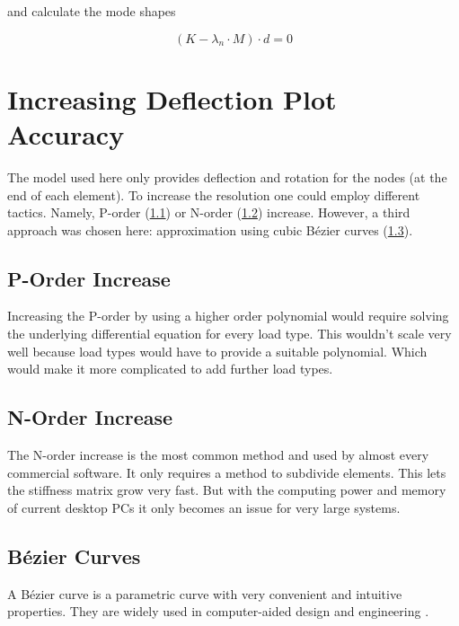 and calculate the mode shapes

\begin{equation*} \label{modeshape}
(K - \lambda_n \cdot M) \cdot d = 0 
\end{equation*}

\section{Increasing Deflection Plot Accuracy}
\label{sec:deflplotaccu}

The model used here only provides deflection and rotation for the nodes (at the end of each element). To increase the resolution one could employ different tactics.
Namely, P-order (\cref{subsec:porder}) or N-order (\cref{subsec:norder}) increase.
However, a third approach was chosen here: approximation using cubic B\'{e}zier curves (\cref{subsec:bezier}).

\subsection{P-Order Increase}
\label{subsec:porder}

Increasing the P-order by using a higher order polynomial would require solving the underlying differential equation for every load type.
This wouldn't scale very well because load types would have to provide a suitable polynomial. Which would make it more complicated to add further load types. 

\subsection{N-Order Increase}
\label{subsec:norder}

The N-order increase is the most common method and used by almost every commercial software. It only requires a method to subdivide elements.
This lets the stiffness matrix grow very fast. But with the computing power and memory of current desktop PCs it only becomes an issue for very large systems.

\subsection{B\'{e}zier Curves}
\label{subsec:bezier}

A B\'{e}zier curve is a parametric curve with very convenient and intuitive properties. They are widely used in computer-aided design and engineering \cite[1.3]{beziercad} \cite[3.-5.]{bezier}.

